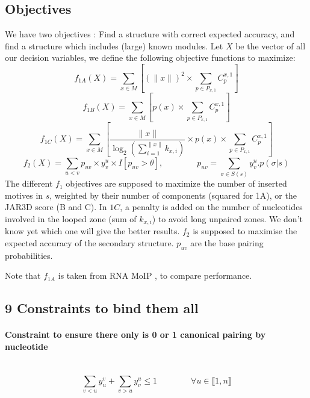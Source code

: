 \documentclass{article}
\begin{document}
\subsection{Objectives \label{objectives}}
We have two objectives : Find a structure with correct expected accuracy, and find a structure which includes (large) known modules.
Let $X$ be the vector of all our decision variables, we define the following objective functions to maximize:
\[ f_{1A}(X) = \sum_{x \in M} \left[ (\|x\|)^2 \times \sum_{p \in P_{x,1}} C^{x,1}_p \right]\]
\[ f_{1B}(X) = \sum_{x \in M} \left[ p(x) \times \sum_{p \in P_{x,1}} C^{x,1}_p \right]\]
\[ f_{1C}(X) = \sum_{x \in M} \left[ \frac{\|x\|}{\log_2(\sum_{i=1}^{\|x\|}k_{x,i})} \times p(x) \times \sum_{p \in P_{x,1}} C^{x,1}_p \right]\]
$$ f_2(X) = \sum_{u<v} p_{uv}\times y^u_v \times I[p_{uv}>\theta], \qquad \qquad
p_{uv} = \sum_{\sigma \in S(s)} y^u_v.p(\sigma | s)$$
The different $f_1$ objectives are supposed to maximize the number of inserted motives in $s$, 
weighted by their number of components (squared for 1A), or the JAR3D score (B and C). 
In $1C$, a penalty is added on the number of nucleotides involved in the looped zone (sum of $k_{x,i}$) to avoid long unpaired zones. 
We don't know yet which one will give the better results.
$f_2$ is supposed to maximise the expected accuracy of the secondary structure. 
$p_{uv}$ are the base pairing probabilities.

Note that \(f_{1A}\) is taken from RNA MoIP \cite{reinharz_towards_2012}, to compare performance.

\subsection{9 Constraints to bind them all}
\paragraph{Constraint to ensure there only is 0 or 1 canonical pairing by nucleotide} ~ 
\begin{equation} \label{constraint:1}
	\sum_{v<u} y^v_u + \sum_{v>u} y^u_v \leq 1 \qquad\qquad \forall u \in \llbracket 1,n \rrbracket
\end{equation}
	
\end{document}
